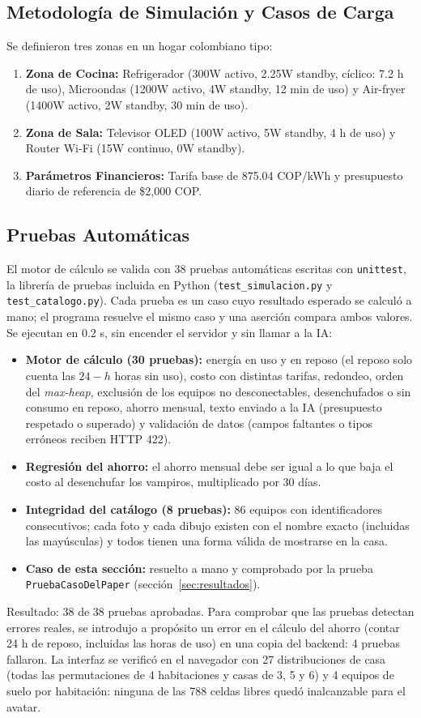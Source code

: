 \documentclass[10pt,journal,compsoc]{IEEEtran}
\begin{document}
\subsection{Metodología de Simulación y Casos de Carga}
Se definieron tres zonas en un hogar colombiano tipo:
\begin{enumerate}
\item \textbf{Zona de Cocina:} Refrigerador (300W activo, 2.25W standby, cíclico: 7.2 h de uso), Microondas (1200W activo, 4W standby, 12 min de uso) y Air-fryer (1400W activo, 2W standby, 30 min de uso).
\item \textbf{Zona de Sala:} Televisor OLED (100W activo, 5W standby, 4 h de uso) y Router Wi-Fi (15W continuo, 0W standby).
\item \textbf{Parámetros Financieros:} Tarifa base de 875.04 COP/kWh y presupuesto diario de referencia de \$2,000 COP.
\end{enumerate}

\subsection{Pruebas Automáticas}
El motor de cálculo se valida con 38 pruebas automáticas escritas con \texttt{unittest}, la librería de pruebas incluida en Python (\texttt{test\_simulacion.py} y \texttt{test\_catalogo.py}). Cada prueba es un caso cuyo resultado esperado se calculó a mano; el programa resuelve el mismo caso y una aserción compara ambos valores. Se ejecutan en 0.2 s, sin encender el servidor y sin llamar a la IA:
\begin{itemize}
\item \textbf{Motor de cálculo (30 pruebas):} energía en uso y en reposo (el reposo solo cuenta las $24-h$ horas sin uso), costo con distintas tarifas, redondeo, orden del \emph{max-heap}, exclusión de los equipos no desconectables, desenchufados o sin consumo en reposo, ahorro mensual, texto enviado a la IA (presupuesto respetado o superado) y validación de datos (campos faltantes o tipos erróneos reciben HTTP 422).
\item \textbf{Regresión del ahorro:} el ahorro mensual debe ser igual a lo que baja el costo al desenchufar los vampiros, multiplicado por 30 días.
\item \textbf{Integridad del catálogo (8 pruebas):} 86 equipos con identificadores consecutivos; cada foto y cada dibujo existen con el nombre exacto (incluidas las mayúsculas) y todos tienen una forma válida de mostrarse en la casa.
\item \textbf{Caso de esta sección:} resuelto a mano y comprobado por la prueba \texttt{PruebaCasoDelPaper} (sección~\ref{sec:resultados}).
\end{itemize}
Resultado: 38 de 38 pruebas aprobadas. Para comprobar que las pruebas detectan errores reales, se introdujo a propósito un error en el cálculo del ahorro (contar 24 h de reposo, incluidas las horas de uso) en una copia del backend: 4 pruebas fallaron. La interfaz se verificó en el navegador con 27 distribuciones de casa (todas las permutaciones de 4 habitaciones y casas de 3, 5 y 6) y 4 equipos de suelo por habitación: ninguna de las 788 celdas libres quedó inalcanzable para el avatar.
\end{document}
